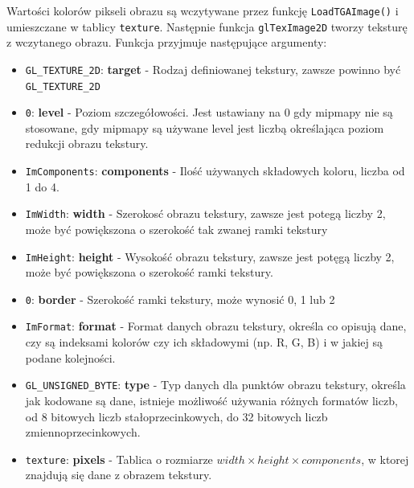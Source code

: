 \documentclass[a4paper]{article}
\begin{document}
Wartości kolorów pikseli obrazu są wczytywane przez funkcję
\texttt{LoadTGAImage()} i umieszczane w tablicy \verb|texture|.
Następnie funkcja \verb|glTexImage2D| tworzy teksturę z wczytanego obrazu.
Funkcja przyjmuje następujące argumenty:

\begin{itemize}
    \item \verb|GL_TEXTURE_2D|: \textbf{target} - Rodzaj definiowanej tekstury,
          zawsze powinno być \verb|GL_TEXTURE_2D|

    \item \verb|0|: \textbf{level} - Poziom szczegółowości. Jest ustawiany na 0
          gdy mipmapy nie są stosowane, gdy mipmapy są używane level jest liczbą
          określająca poziom redukcji obrazu tekstury.

    \item \verb|ImComponents|: \textbf{components} - Ilość używanych składowych
          koloru, liczba od 1 do 4.

    \item \verb|ImWidth|: \textbf{width} - Szerokosć obrazu tekstury, zawsze
          jest potegą liczby 2, może być powiększona o szerokość tak zwanej
          ramki tekstury

    \item \verb|ImHeight|: \textbf{height} - Wysokość obrazu tekstury, zawsze
          jest potęgą liczby 2, może być powiększona o szerokość ramki tekstury.

    \item \verb|0|: \textbf{border} - Szerokość ramki tekstury, może wynosić 0,
          1 lub 2

    \item \verb|ImFormat|: \textbf{format} - Format danych obrazu tekstury,
          określa co opisują dane, czy są indeksami kolorów czy ich składowymi
          (np. R, G, B) i w jakiej są podane kolejności.

    \item \verb|GL_UNSIGNED_BYTE|: \textbf{type} - Typ danych dla punktów obrazu
          tekstury, określa jak kodowane są dane, istnieje możliwość używania
          różnych formatów liczb, od 8 bitowych liczb stałoprzecinkowych, do 32
          bitowych liczb zmiennoprzecinkowych.

    \item \verb|texture|: \textbf{pixels} - Tablica o rozmiarze $width \times
              height \times components$, w ktorej znajdują się dane z obrazem
          tekstury.
\end{itemize}
\end{document}
